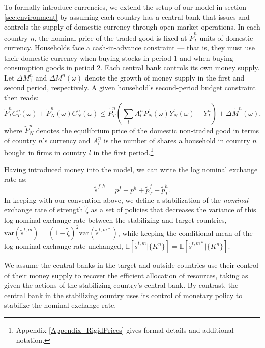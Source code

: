\documentclass[12pt,letter]{article}
\theoremstyle{break} \theorembodyfont{\normalfont\itshape}
\theoremstyle{break}
\theoremstyle{break} \theorembodyfont{\normalfont\itshape}
\theoremstyle{break} \theorembodyfont{\normalfont\itshape}
\begin{document}
To formally introduce currencies, we extend the setup of our model in
section \ref{sec:environment} by assuming each country has a central
bank that issues and controls the supply of domestic currency through
open market operations. In each country $n$, the nominal price of the
traded good is fixed at $\tilde{P}^n_T$ units of domestic currency.
Households face a cash-in-advance constraint --- that is, they must
use their domestic currency when buying stocks in period 1 and when
buying consumption goods in period 2. Each central bank controls its
own money supply. Let $\Delta M^n_1 $ and $\Delta M^n(\omega)$ denote
the growth of money supply in the first and second period,
respectively. A given household's second-period budget constraint then
reads:
\begin{equation}
  \tilde{P}^n_T C^n_T(\omega)
  + \tilde{P}^n_N (\omega)C^n_N
  (\omega)\le  \tilde{P}^n_T
  \left( \sum_l A^n_l P^l_N(\omega)Y^l_N (\omega)+ Y^n_T \right) +
  \Delta \tilde M^{n}(\omega) ,
\end{equation}  
where $\tilde{P}^n_N$ denotes the equilibrium price of the domestic
non-traded good in terms of country \(n\)'s currency and \(A^n_l\) is
the number of shares a household in country \(n\) bought in firms in
country \(l\) in the first period.\footnote{Appendix
  \ref{Appendix_RigidPrices} gives formal details and additional
  notation.}


Having introduced money into the model, we can write the log nominal
exchange rate as:
\begin{equation}
  \tilde{s}^{f,h}=p^f-p^h+\tilde{p}_T^f-\tilde{p}_T^h.
  \label{eq:snominal}
\end{equation}
In keeping with our convention above, we define a stabilization of the
\textit{nominal} exchange rate of strength $\tilde\zeta$ as a set of
policies that decreases the variance of this log nominal exchange rate
between the stabilizing and target countries,
$\text{var} \left( \tilde{s}^{t, m} \right) = (1 - \tilde\zeta)^2
\text{var}\left( \tilde{s}^{t, m\ast} \right)$, while keeping the
conditional mean of the log nominal exchange rate unchanged,
$\mathbb{E}\left[ \tilde{s}^{t, m} |\{K^n\}\right] = \mathbb{E}\left[
  \tilde{s}^{t, m\ast}|\{K^n\} \right]$.

We assume the central banks in the target and outside countries use
their control of their money supply to recover the efficient
allocation of resources, taking as given the actions of the
stabilizing country's central bank. By contrast, the central bank in
the stabilizing country uses its control of monetary policy to
stabilize the nominal exchange rate.
\end{document}
